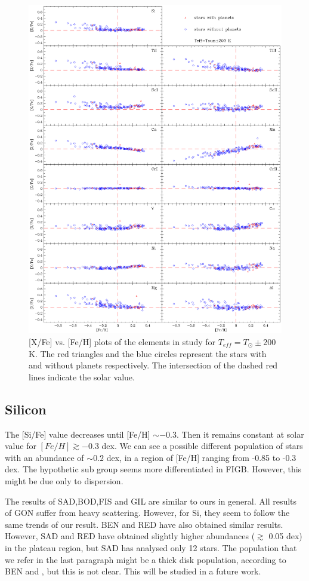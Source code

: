 \documentclass[dvips,12pt,a4paper]{report}
\begin{document}
{{\begin{figure}[h]
\centering
\includegraphics[width=16 cm, height=15 cm]{pics/parte4/xfefehfinal/xfefehtsolfinal.eps}
\caption[abundance gfx for solar temperatures]{[X/Fe] vs. [Fe/H] plots of the elements in study for $T_{eff}=T_\odot\pm$200 K. The red triangles and the blue circles represent the stars with and without planets respectively. The intersection of the dashed red lines indicate the solar value.}
\label{xfefeh2}
\end{figure}

\subsection {Silicon}

The [Si/Fe] value decreases until [Fe/H] $\sim -0.3$. Then it remains constant at solar value for $[Fe/H] \gtrsim - 0.3$ dex. We can see a possible different population of stars with an abundance of $\sim 0.2$ dex, in a region of [Fe/H] ranging from -0.85 to -0.3 dex. The hypothetic sub group seems more differentiated in FIGB. However, this might be due only to dispersion.

The results of SAD,BOD,FIS and GIL are similar to ours in general. All results of GON suffer from heavy scattering. However, for Si, they seem to follow the same trends of our result. BEN and RED have also obtained similar results. However, SAD and RED have obtained slightly higher abundances ($\gtrsim$ 0.05 dex) in the plateau region, but SAD has analysed only 12 stars. The population that we refer in the last paragraph might be a thick disk population, according to BEN and \citet{Fuhrmann-2004}, but this is not clear. This will be studied in a future work. 

}}
\end{document}
